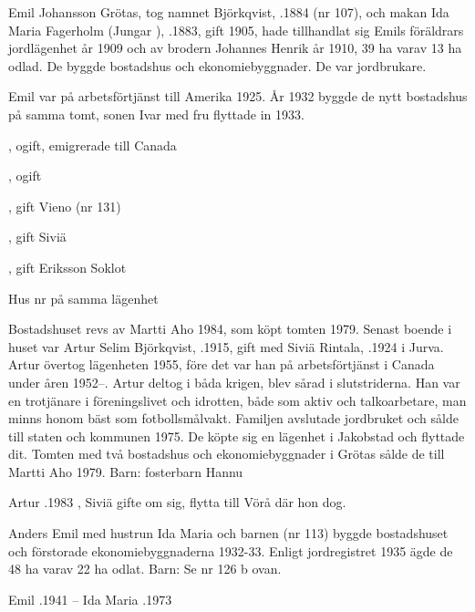 Emil Johansson Grötas, tog namnet Björkqvist, .1884 (nr 107), och makan Ida Maria Fagerholm (Jungar    ), .1883, gift 1905, hade tillhandlat sig Emils föräldrars jordlägenhet år 1909 och av brodern Johannes Henrik år 1910, 39 ha varav 13 ha odlad. De byggde bostadshus och ekonomiebyggnader. De var jordbrukare.

Emil var på arbetsförtjänst till Amerika 1925. År 1932 byggde de nytt bostadshus på samma tomt, sonen Ivar med fru  flyttade in 1933.
\begin{jhchildren}
  \item {}, ogift, emigrerade till Canada
  \item {}, ogift
  \item {}, gift Vieno (nr 131)
  \item {}, gift Siviä
  \item {}, gift Eriksson Soklot
\end{jhchildren}


Hus nr  på samma lägenhet

Bostadshuset revs av Martti Aho 1984, som köpt tomten 1979. Senast boende i huset var Artur Selim Björkqvist, .1915, gift med Siviä Rintala, .1924 i Jurva. Artur övertog lägenheten 1955, före det var han på arbetsförtjänst i Canada under åren 1952--. Artur deltog i båda krigen, blev sårad i slutstriderna.  Han var  en trotjänare i föreningslivet och idrotten, både som aktiv och talkoarbetare, man minns honom bäst som fotbollsmålvakt.  Familjen avslutade jordbruket och sålde till staten och kommunen 1975. De köpte sig en lägenhet i Jakobstad och flyttade dit. Tomten med två bostadshus och ekonomiebyggnader i Grötas sålde de till Martti Aho 1979.
Barn: fosterbarn Hannu

Artur .1983 , Siviä gifte om sig, flytta till Vörå där hon dog.


Anders Emil med hustrun Ida Maria och barnen (nr 113) byggde bostadshuset och förstorade ekonomiebyggnaderna 1932-33. Enligt jordregistret 1935 ägde de 48 ha varav 22 ha odlat.
Barn: Se nr 126 b ovan.

Emil .1941  --  Ida Maria .1973



